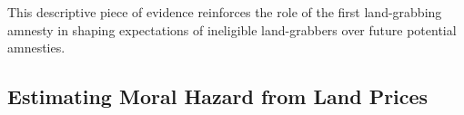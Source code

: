 \documentclass[12pt]{article}
\begin{document}
\quad This descriptive piece of evidence reinforces the role of the first land-grabbing amnesty in shaping expectations of ineligible land-grabbers over future potential amnesties.  


\subsection{Estimating Moral Hazard from Land Prices}
\ 
\end{document}

